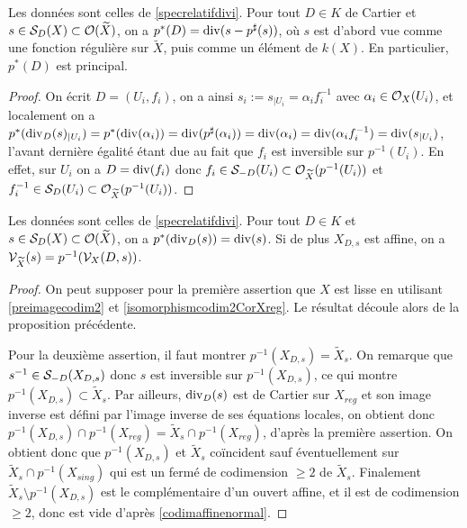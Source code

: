 \begin{prop}\label{pstarPrincipalCartier}
Les données sont celles de \ref{specrelatifdivi}. Pour tout $D\in K$ de Cartier et $s\in\mathcal{S}_D(X)\subset \mathcal{O}(\widetilde{X})$, on a $p^*(D)=\operatorname{div}(s-p^\sharp(s))$, où $s$ est d'abord vue comme une fonction régulière sur $\widetilde{X}$, puis comme un élément de $k(X)$. En particulier, $p^*(D)$ est principal.
\end{prop}
\begin{proof}
On écrit $D=(U_i, f_i)$, on a ainsi $s_i:=s_{|U_i}=\alpha_i f_i^{-1}$ avec $\alpha_i\in \mathcal{O}_X(U_i)$, et localement on a $p^*(\operatorname{div}_D(s)_{|U_i})=p^*(\operatorname{div}(\alpha_i))=\operatorname{div}(p^\sharp(\alpha_i))=\operatorname{div}(\alpha_i)=\operatorname{div}(\alpha_i f_i^{-1})=\operatorname{div}(s_{|U_i})$, l'avant dernière égalité étant due au fait que $f_i$ est inversible sur $p^{-1}(U_i)$. En effet, sur $U_i$ on a $D=\operatorname{div}(f_i)$ donc $f_i\in \mathcal{S}_{-D}(U_i)\subset\mathcal{O}_{\widetilde{X}}(p^{-1}(U_i))$ et $f_i^{-1}\in \mathcal{S}_D(U_i)\subset\mathcal{O}_{\widetilde{X}}(p^{-1}(U_i))$.
\end{proof}

\begin{prop}\label{pstarprincipal}
Les données sont celles de \ref{specrelatifdivi}. Pour tout $D\in K$ et $s\in\mathcal{S}_D(X)\subset \mathcal{O}(\widetilde{X})$, on a $p^*(\operatorname{div}_D(s))=\operatorname{div}(s)$. Si de plus $X_{D,s}$ est affine, on a $\mathcal{V}_{\widetilde{X}}(s)=p^{-1}(\mathcal{V}_X(D,s))$.
\end{prop}
\begin{proof}
On peut supposer pour la première assertion que $X$ est lisse en utilisant \ref{preimagecodim2} et \ref{isomorphismcodim2CorXreg}. Le résultat découle alors de la proposition précédente.

Pour la deuxième assertion, il faut montrer $p^{-1}(X_{D,s})=\widetilde{X}_s$. On remarque que $s^{-1}\in \mathcal{S}_{-D}(X_{D,s})$ donc $s$ est inversible sur $p^{-1}(X_{D,s})$, ce qui montre $p^{-1}(X_{D,s})\subset \widetilde{X}_s$. Par ailleurs, $\operatorname{div}_D(s)$ est de Cartier sur $X_{reg}$ et son image inverse est défini par l'image inverse de ses équations locales, on obtient donc $p^{-1}(X_{D,s})\cap p^{-1}(X_{reg})=\widetilde{X}_s \cap p^{-1}(X_{reg})$, d'après la première assertion. On obtient donc que $p^{-1}(X_{D,s})$ et $\widetilde{X}_s$ coïncident sauf éventuellement sur $\widetilde{X}_s\cap p^{-1}(X_{sing})$ qui est un fermé de codimension $\geq 2$ de $\widetilde{X}_s$. Finalement $\widetilde{X}_s \setminus p^{-1}(X_{D,s})$ est le complémentaire d'un ouvert affine, et il est de codimension $\geq 2$, donc est vide d'après \ref{codimaffinenormal}.
\end{proof}

